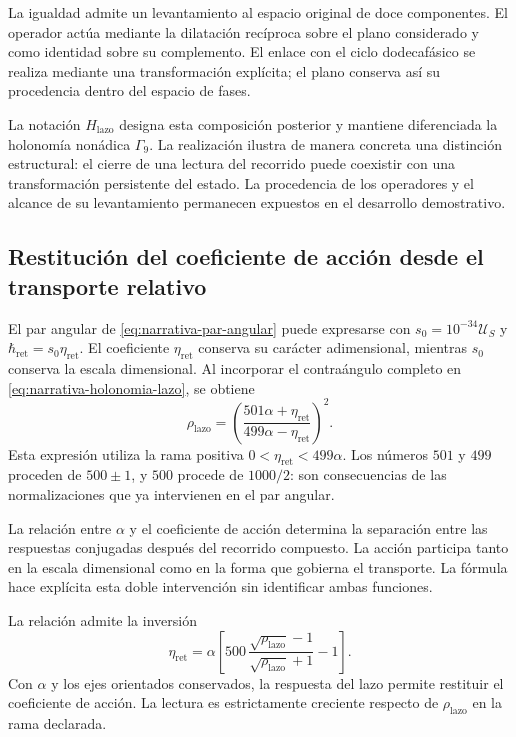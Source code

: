 La igualdad admite un levantamiento al espacio original de doce
componentes. El operador actúa mediante la dilatación recíproca sobre el
plano considerado y como identidad sobre su complemento. El enlace con
el ciclo dodecafásico se realiza mediante una transformación explícita;
el plano conserva así su procedencia dentro del espacio de fases.

La notación $H_{\mathrm{lazo}}$ designa esta composición posterior y
mantiene diferenciada la holonomía nonádica $\Gamma_9$. La realización
ilustra de manera concreta una distinción estructural: el cierre de una
lectura del recorrido puede coexistir con una transformación persistente
del estado. La procedencia de los operadores y el alcance de su
levantamiento permanecen expuestos en el desarrollo demostrativo.

\subsection{Restitución del coeficiente de acción desde el transporte relativo}
\label{subsec:narrativa-restitucion-accion}

El par angular de \eqref{eq:narrativa-par-angular} puede expresarse con
$s_0=10^{-34}\mathcal U_S$ y
$\hbar_{\mathrm{ret}}=s_0\eta_{\mathrm{ret}}$. El coeficiente
$\eta_{\mathrm{ret}}$ conserva su carácter adimensional, mientras $s_0$
conserva la escala dimensional. Al incorporar el contraángulo completo
en \eqref{eq:narrativa-holonomia-lazo}, se obtiene
\begin{equation}
 \boxed{
 \rho_{\mathrm{lazo}}=
 \left(\frac{501\alpha+\eta_{\mathrm{ret}}}
              {499\alpha-\eta_{\mathrm{ret}}}\right)^2.}
 \label{eq:narrativa-lazo-alfa-accion}
\end{equation}
Esta expresión utiliza la rama positiva
$0<\eta_{\mathrm{ret}}<499\alpha$. Los números $501$ y $499$ proceden
de $500\pm1$, y $500$ procede de $1000/2$: son consecuencias de las
normalizaciones que ya intervienen en el par angular.

La relación entre $\alpha$ y el coeficiente de acción determina la
separación entre las respuestas conjugadas después del recorrido
compuesto. La acción participa tanto en la escala dimensional como en
la forma que gobierna el transporte. La fórmula hace explícita esta
doble intervención sin identificar ambas funciones.

La relación admite la inversión
\begin{equation}
 \boxed{
 \eta_{\mathrm{ret}}=
 \alpha\left[
 500\,\frac{\sqrt{\rho_{\mathrm{lazo}}}-1}
               {\sqrt{\rho_{\mathrm{lazo}}}+1}-1\right].}
 \label{eq:narrativa-inversa-accion}
\end{equation}
Con $\alpha$ y los ejes orientados conservados, la respuesta del lazo
permite restituir el coeficiente de acción. La lectura es estrictamente
creciente respecto de $\rho_{\mathrm{lazo}}$ en la rama declarada.

